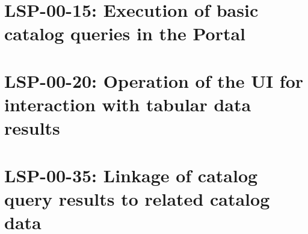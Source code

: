 \documentclass[DM,lsstdraft,STR,toc]{lsstdoc}
\begin{document}
\section{LSP-00-15: Execution of basic catalog queries in the Portal}
\label{sect:lsp-00-15}

\section{LSP-00-20: Operation of the UI for interaction with tabular data results}
\label{sect:lsp-00-20}

\section{LSP-00-35: Linkage of catalog query results to related catalog data}
\label{sect:lsp-00-35}
\end{document}
